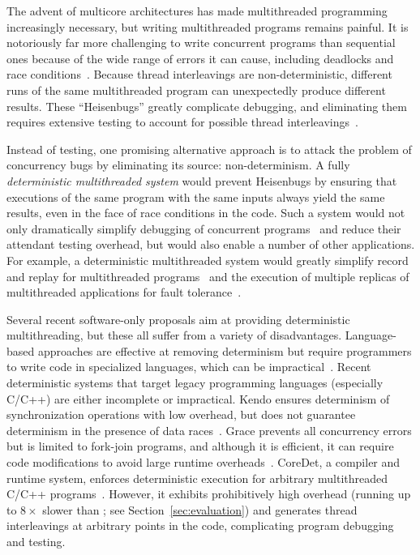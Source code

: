 \label{sec:introduction}

The advent of multicore architectures has made multithreaded
programming increasingly necessary, but writing multithreaded programs
remains painful. It is notoriously far more challenging to write
concurrent programs than sequential ones because of the wide range of
errors it can cause, including deadlocks and race
conditions~\cite{havender,76897,130623}. Because thread interleavings
are non-deterministic, different runs of the same multithreaded
program can unexpectedly produce different results. These
``Heisenbugs'' greatly complicate debugging, and eliminating them
requires extensive testing to account for possible thread
interleavings~\cite{DBLP:conf/icse/BallBHMQ09,DBLP:conf/asplos/BurckhardtKMN10}.


Instead of testing, one promising alternative approach is to attack
the problem of concurrency bugs by eliminating its source:
non-determinism. A fully \emph{deterministic multithreaded system}
would prevent Heisenbugs by ensuring that executions of the same
program with the same inputs always yield the same results, even in
the face of race conditions in the code. Such a system would not only
dramatically simplify debugging of concurrent
programs~\cite{Carver:1991:RTC:624586.625040} and reduce their
attendant testing overhead, but would also enable a number of other
applications. For example, a deterministic multithreaded system would
greatly simplify record and replay for multithreaded
programs~\cite{Choi:1998:DRJ:281035.281041,LeBlanc:1987:DPP:32387.32396}
and the execution of multiple replicas of multithreaded applications
for fault
tolerance~\cite{deterministic-process-groups,1134000,224058,replicant-hotos}.

Several recent software-only proposals aim at providing
deterministic multithreading, but these all suffer from a variety of
disadvantages. Language-based approaches are effective at removing
determinism but require programmers to write code in specialized
languages, which can be
impractical~\cite{Bocchino:2009:TES:1640089.1640097,Burckhardt:2010:CPR:1869459.1869515,Simpson:1999:SEE:330346.330357}. Recent
deterministic systems that target legacy programming languages
(especially C/C++) are either incomplete or impractical. Kendo ensures
determinism of synchronization operations with low overhead, but does
not guarantee determinism in the presence of data
races~\cite{1508256}. Grace prevents all concurrency errors but is
limited to fork-join programs, and although it is efficient, it can require
code modifications to avoid large runtime
overheads~\cite{grace}. CoreDet, a compiler and runtime system,
enforces deterministic execution for arbitrary multithreaded C/C++
programs~\cite{Bergan:2010:CCR:1736020.1736029}. However, it exhibits
prohibitively high overhead (running up to $8\times$ slower
than \pthreads{}; see Section~\ref{sec:evaluation}) and generates
thread interleavings at arbitrary points
in the code, complicating program debugging and testing.

